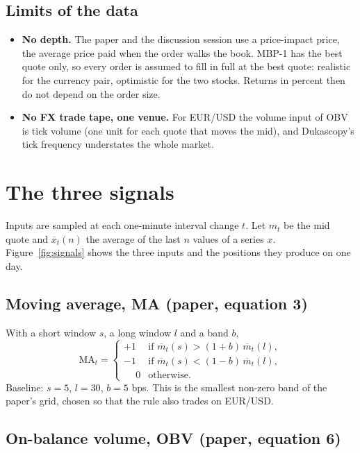 \documentclass[11pt]{article}
\begin{document}
\subsection{Limits of the data}

\begin{itemize}
  \item \textbf{No depth.} The paper and the discussion session use a
        price-impact price, the average price paid when the order walks the book.
        MBP-1 has the best quote only, so every order is assumed to fill in full
        at the best quote: realistic for the currency pair, optimistic for the two
        stocks. Returns in percent then do not depend on the order size.
  \item \textbf{No FX trade tape, one venue.} For EUR/USD the volume input of OBV
        is tick volume (one unit for each quote that moves the mid), and
        Dukascopy's tick frequency understates the whole market.
\end{itemize}

\section{The three signals}
\label{sec:signals}

Inputs are sampled at each one-minute interval change $t$. Let $m_t$ be the mid
quote and $\overline{x}_t(n)$ the average of the last $n$ values of a series $x$.
Figure~\ref{fig:signals} shows the three inputs and the positions they produce on
one day.

\subsection{Moving average, MA (paper, equation 3)}

With a short window $s$, a long window $l$ and a band $b$,
\[
  \text{MA}_t =
  \begin{cases}
    +1 & \text{if } \overline{m}_t(s) > (1+b)\,\overline{m}_t(l), \\
    -1 & \text{if } \overline{m}_t(s) < (1-b)\,\overline{m}_t(l), \\
    \phantom{+}0 & \text{otherwise.}
  \end{cases}
\]
Baseline: $s = 5$, $l = 30$, $b = 5$ bps. This is the smallest non-zero band of
the paper's grid, chosen so that the rule also trades on EUR/USD.

\subsection{On-balance volume, OBV (paper, equation 6)}
\end{document}
